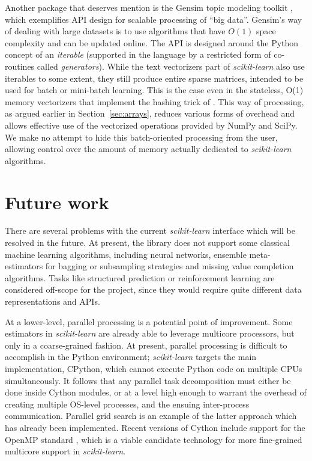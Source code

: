 \documentclass{llncs}
\newcommand{\sklearn}{\textit{scikit-learn}\xspace}
\begin{document}
Another package that deserves mention is the Gensim topic modeling toolkit
\citep{rehurek2010gensim},
which exemplifies API design for scalable processing of ``big data''.
Gensim's way of dealing with large datasets is to use algorithms
that have $O(1)$ space complexity and can be updated online.
The API is designed around the Python concept of an \textit{iterable}
(supported in the language by a restricted form of co-routines called
\textit{generators}).
While the text vectorizers part of \sklearn
also use iterables to some extent,
they still produce entire sparse matrices, intended to be used for batch or
mini-batch learning. This is the case
even in the stateless, O(1) memory vectorizers
that implement the hashing trick of \citet{weinberger2009}.
This way of processing, as argued earlier in Section~\ref{sec:arrays},
reduces various forms of overhead
and allows effective use of the vectorized operations provided by NumPy and 
SciPy.  We make no attempt to hide this batch-oriented processing from the user,
allowing control over the amount of memory actually dedicated
to \sklearn algorithms.

\section{Future work}
\label{sec:future_work}
There are several problems with the current \sklearn interface which
will be resolved in the future.
At present, the library does not support some classical machine learning
algorithms,
including neural networks, ensemble meta-estimators for
bagging or subsampling strategies and missing value completion algorithms.
Tasks like structured prediction or reinforcement learning are
considered off-scope for the project, since they would require quite different
data representations and APIs.

At a lower-level, parallel processing is a potential point of improvement.
Some estimators in \sklearn are already able to leverage multicore processors,
but only in a coarse-grained fashion.
At present, parallel processing is difficult to accomplish in the Python environment;
\sklearn targets the main implementation, CPython,
which cannot execute Python code on multiple CPUs simultaneously.
It follows that any parallel task decomposition must either be done
inside Cython modules,
or at a level high enough to warrant the overhead
of creating multiple OS-level processes,
and the ensuing inter-process communication.
Parallel grid search is an example of the latter approach
which has already been implemented.
Recent versions of Cython include support for the OpenMP standard
\citep{dagum1998openmp},
which is a viable candidate technology
for more fine-grained multicore support in \sklearn.
\end{document}
